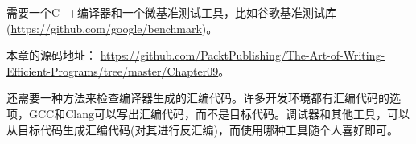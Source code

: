 需要一个C++编译器和一个微基准测试工具，比如谷歌基准测试库(\url{https://github.com/google/benchmark})。 

本章的源码地址： \url{https://github.com/PacktPublishing/The-Art-of-Writing-Efficient-Programs/tree/master/Chapter09}。

还需要一种方法来检查编译器生成的汇编代码。许多开发环境都有汇编代码的选项，GCC和Clang可以写出汇编代码，而不是目标代码。调试器和其他工具，可以从目标代码生成汇编代码(对其进行反汇编)，而使用哪种工具随个人喜好即可。